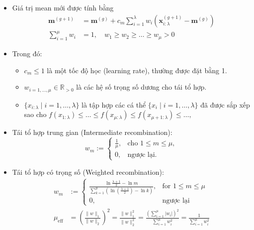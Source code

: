 \documentclass{book}
\begin{document}
\begin{itemize}
    \item Giá trị mean mới được tính bằng
    \begin{equation*}
        \begin{aligned} 
            \mathbf{m}^{(g+1)} &= \mathbf{m}^{(g)} + c_m \sum_{i=1}^{\lambda} w_i (\mathbf{x}^{(g+1)}_{i:\lambda} - \mathbf{m}^{(g)}) \\
            \sum_{i=1}^{\mu} w_i &= 1, \quad w_1 \geq w_2 \geq \dots \geq w_\mu > 0
        \end{aligned}
    \end{equation*}
    \item[] Trong đó:
    \begin{itemize}
        \item $c_m\leq 1$ là một tốc độ học (learning rate), thường được đặt bằng 1.
        \item $w_{i=1,\dots,\mu}\in\mathbb{R}_{>0}$ là các hệ số trọng số dương cho tái tổ hợp.
        \item $\{x_{i:\lambda} \mid i=1,\ldots,\lambda\}$ là tập hợp các cá thể $\{x_i \mid i=1,\dots,\lambda\}$ đã được sắp xếp sao cho $f(x_{1:\lambda})\leq\dots\leq f(x_{\mu:\lambda})\leq f(x_{\mu+1:\lambda})\leq \dots,$
    \end{itemize}
    \item Tái tổ hợp trung gian (Intermediate recombination):
    \begin{equation*}
        w_{m}:= \begin{cases}
            \frac{1}{\mu}, & \text{cho } 1 \leq m \leq \mu, \\
            0, & \text{ngược lại}.
        \end{cases}
    \end{equation*}
    \item Tái tổ hợp có trọng số (Weighted recombination):
    \begin{equation*}
        \begin{aligned}
            w_m &:= \begin{cases}
                \frac{\ln{\frac{\lambda+1}{2}}-\ln{m}}{\sum_{k=1}^{\mu}(\ln(\frac{\lambda+1}{2})-\ln{k})}, & \text{for } 1\leq m\leq \mu \\
                0, & \text{ngược lại}
            \end{cases} \\
            \mu_{\operatorname{eff}} &= \left(\frac{\|w\|_1}{\|w\|_2}\right)^2 = \frac{\|w\|_1^2}{\|w\|_2^2} = \frac{(\sum_{i=1}^\mu{|w_i|})^2}{\sum_{i=1}^{\mu}{w_i^2}} = \frac{1}{\sum_{i=1}^{\mu}w_i^2}

\end{aligned}
\end{equation*}
\end{itemize}
\end{document}
